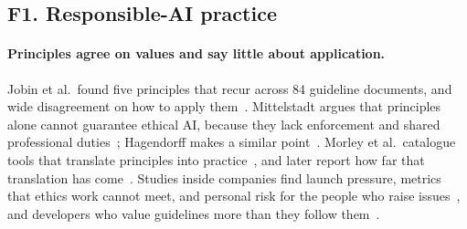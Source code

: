 \subsection{F1. Responsible-AI practice}
\label{sec:survey-rai}

\paragraph{Principles agree on values and say little about application.}
Jobin et al.\ found five principles that recur across 84 guideline documents,
and wide disagreement on how to apply them~\citep{jobin2019global}. Mittelstadt
argues that principles alone cannot guarantee ethical AI, because they lack
enforcement and shared professional duties~\citep{mittelstadt2019principles};
Hagendorff makes a similar point~\citep{hagendorff2020ethics}. Morley et al.\
catalogue tools that translate principles into practice~\citep{morley2020what},
and later report how far that translation has come~\citep{morley2023operationalising}.
Studies inside companies find launch pressure, metrics that ethics work cannot
meet, and personal risk for the people who raise
issues~\citep{rakova2021where,ali2023walking}, and developers who value
guidelines more than they follow them~\citep{ximenes2026bridging}.

